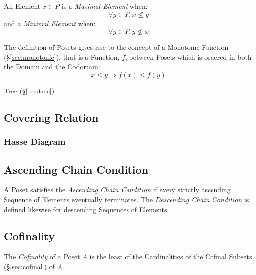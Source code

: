 An Element $x \in P$ is a \emph{Maximal Element} when:
\[
  \forall y \in P, x \nleq y
\]
and a \emph{Minimal Element} when:
\[
  \forall y \in P, y \nleq x
\]

The definition of Posets gives rise to the concept of a Monotonic
Function (\S\ref{sec:monotonic}), that is a Function, $f$, between
Posets which is ordered in both the Domain and the Codomain:
\[
  x \leq y \Rightarrow f(x) \leq f(y)
\]

Tree (\S\ref{sec:tree})



\subsection{Covering Relation}\label{sec:covering_relation}

\subsubsection{Hasse Diagram}\label{sec:hasse_diagram}



\subsection{Ascending Chain Condition}\label{sec:ascending_chain}

A Poset satisfies the \emph{Ascending Chain Condition} if every
strictly ascending Sequence of Elements eventually terminates. The
\emph{Descending Chain Condition} is defined likewise for descending
Sequences of Elements.



\subsection{Cofinality}\label{sec:cofinality}

The \emph{Cofinality} of a Poset $A$ is the least of the Cardinalities
of the Cofinal Subsets (\S\ref{sec:cofinal}) of $A$.



